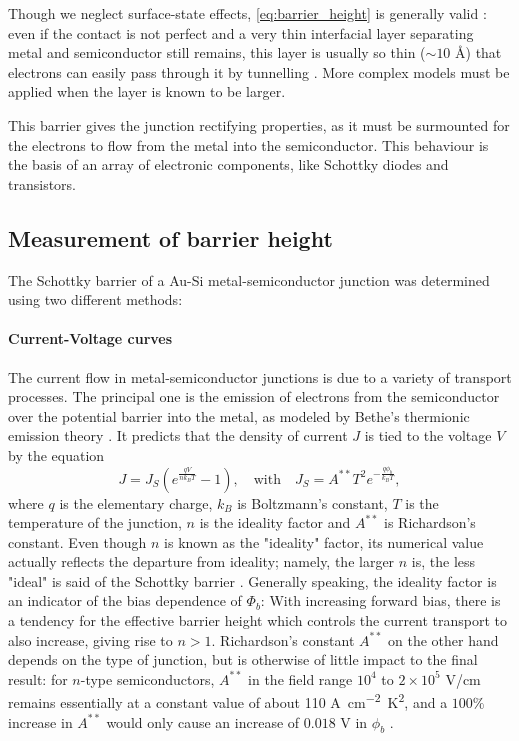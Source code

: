 Though we neglect surface-state effects, \autoref{eq:barrier_height} is generally valid \cite{sze_physics_2007}:
even if the contact is not perfect and a very thin interfacial layer separating metal and semiconductor still remains, this layer is usually so thin ($\sim 10$ \AA) that electrons can easily pass through it by tunnelling \cite{rhoderick_physics_1970}.
More complex models must be applied when the layer is known to be larger.

This barrier gives the junction rectifying properties, as it must be surmounted for the electrons to flow from the metal into the semiconductor.
This behaviour is the basis of an array of electronic components, like Schottky diodes and transistors.

\subsection{Measurement of barrier height}
The Schottky barrier of a Au-Si metal-semiconductor junction was determined using two different methods:

\paragraph{Current-Voltage curves}
The current flow in metal-semiconductor junctions is due to a variety of transport processes.
The principal one is the emission of electrons from the semiconductor over the potential barrier into the metal, as modeled by Bethe's thermionic emission theory \cite{sze_physics_2007}.
It predicts that the density of current $J$ is tied to the voltage $V$ by the equation
\begin{equation} \label{eq:thermionic_emission_current}
    J = J_S \left( e^{\frac{qV}{n k_B T}} - 1 \right), \quad \text{{with}} \quad J_S = A^{**} T^2 e^{-\frac{q \phi_b}{k_B T}},
\end{equation}
where $q$ is the elementary charge, $k_B$ is Boltzmann's constant, $T$ is the temperature of the junction, $n$ is the ideality factor and $A^{**}$ is Richardson's constant.
Even though $n$ is known as the  "ideality" factor, its numerical value actually reflects the departure from ideality; namely, the larger $n$ is, the less "ideal" is said of the Schottky barrier \cite{tung_recent_2001}.
Generally speaking, the ideality factor is an indicator of the bias dependence of $\Phi_b$:  With increasing forward bias, there is a tendency for the effective barrier height which controls the current transport to also increase, giving rise to $n > 1$.
Richardson's constant $A^{**}$ on the other hand depends on the type of junction, but is otherwise of little impact to the final result:
for $n$-type semiconductors, $A^{**}$ in the field range $10^4$ to $2\times 10^5$ V/cm remains essentially at a constant value of about 110 \unit{A cm^{-2} K^2}, and a $100 \%$ increase in $A^{**}$ would only cause an increase of $0.018$ V in $\phi_b$ \cite{sze_physics_2007}.

